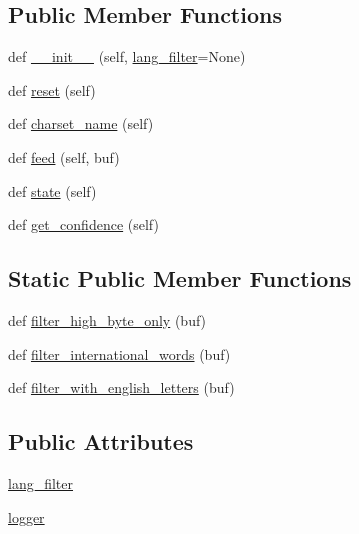 \subsection*{Public Member Functions}
\begin{DoxyCompactItemize}
\item 
def \hyperlink{classpip_1_1__vendor_1_1chardet_1_1charsetprober_1_1CharSetProber_ad48ea6eb78892adf75e53ba26fa158a9}{\+\_\+\+\_\+init\+\_\+\+\_\+} (self, \hyperlink{classpip_1_1__vendor_1_1chardet_1_1charsetprober_1_1CharSetProber_aa0806228646298c509357287bcda15da}{lang\+\_\+filter}=None)
\item 
def \hyperlink{classpip_1_1__vendor_1_1chardet_1_1charsetprober_1_1CharSetProber_aa47b12c232a299bee837a8fcb5ef5fb4}{reset} (self)
\item 
def \hyperlink{classpip_1_1__vendor_1_1chardet_1_1charsetprober_1_1CharSetProber_a68c93c5c862f653c4b2f2782e994d069}{charset\+\_\+name} (self)
\item 
def \hyperlink{classpip_1_1__vendor_1_1chardet_1_1charsetprober_1_1CharSetProber_a1cc41b371da5d90edece17e54f1fdf9b}{feed} (self, buf)
\item 
def \hyperlink{classpip_1_1__vendor_1_1chardet_1_1charsetprober_1_1CharSetProber_acd55b48549a5da92302fc4ea37d46361}{state} (self)
\item 
def \hyperlink{classpip_1_1__vendor_1_1chardet_1_1charsetprober_1_1CharSetProber_a99c08657a0a1ec7a7f8b8609330383fc}{get\+\_\+confidence} (self)
\end{DoxyCompactItemize}
\subsection*{Static Public Member Functions}
\begin{DoxyCompactItemize}
\item 
def \hyperlink{classpip_1_1__vendor_1_1chardet_1_1charsetprober_1_1CharSetProber_a4cf82ac3e546130d11552903fe3fc639}{filter\+\_\+high\+\_\+byte\+\_\+only} (buf)
\item 
def \hyperlink{classpip_1_1__vendor_1_1chardet_1_1charsetprober_1_1CharSetProber_ac2cfc2ed601cea1e6db33b15c5ec99cb}{filter\+\_\+international\+\_\+words} (buf)
\item 
def \hyperlink{classpip_1_1__vendor_1_1chardet_1_1charsetprober_1_1CharSetProber_a1b7cf5cf78aac1f4c22881131478b3b6}{filter\+\_\+with\+\_\+english\+\_\+letters} (buf)
\end{DoxyCompactItemize}
\subsection*{Public Attributes}
\begin{DoxyCompactItemize}
\item 
\hyperlink{classpip_1_1__vendor_1_1chardet_1_1charsetprober_1_1CharSetProber_aa0806228646298c509357287bcda15da}{lang\+\_\+filter}
\item 
\hyperlink{classpip_1_1__vendor_1_1chardet_1_1charsetprober_1_1CharSetProber_a86b0726c4a332a6e28cfec8d0cf6bf24}{logger}
\end{DoxyCompactItemize}
